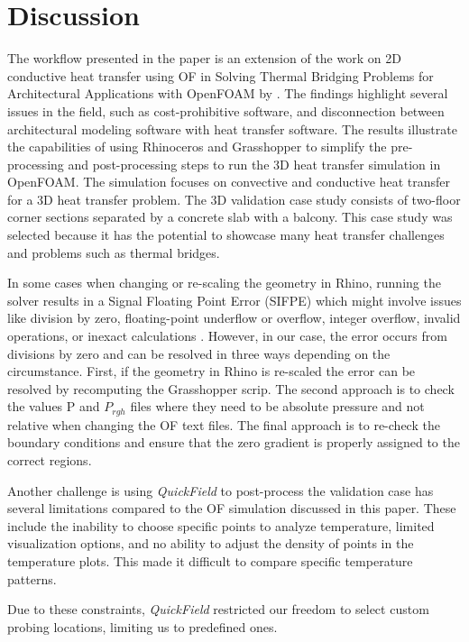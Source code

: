 \section{Discussion}


The workflow presented in the paper is an extension of the work on 2D conductive heat transfer using OF in Solving Thermal Bridging Problems for Architectural Applications with OpenFOAM by \cite{kastner2020solving}. 
The findings highlight several issues in the field, such as cost-prohibitive software, and disconnection between architectural modeling software with heat transfer software. 
The results illustrate the capabilities of using Rhinoceros and Grasshopper to simplify the pre-processing and post-processing steps to run the 3D heat transfer simulation in OpenFOAM. The simulation focuses on convective and conductive heat transfer for a 3D heat transfer problem. The 3D validation case study consists of two-floor corner sections separated by a concrete slab with a balcony. This case study was selected because it has the potential to showcase many heat transfer challenges and problems such as thermal bridges.


In some cases when changing or re-scaling the geometry in Rhino, running the solver results in a Signal Floating Point Error (SIFPE) which might involve issues like division by zero, floating-point underflow or overflow, integer overflow, invalid operations, or inexact calculations \cite{sigfpe}. However, in our case, the error occurs from divisions by zero and can be resolved in three ways depending on the circumstance. First, if the geometry in Rhino is re-scaled the error can be resolved by recomputing the Grasshopper scrip. The second approach is to check the values P and $P_{rgh}$ files where they need to be absolute pressure and not relative when changing the OF text files. The final approach is to re-check the boundary conditions and ensure that the zero gradient is properly assigned to the correct regions.


Another challenge is using \textit{QuickField} to post-process the validation case has several limitations compared to the OF simulation discussed in this paper. These include the inability to choose specific points to analyze temperature, limited visualization options, and no ability to adjust the density of points in the temperature plots. This made it difficult to compare specific temperature patterns.

Due to these constraints, \textit{QuickField} restricted our freedom to select custom probing locations, limiting us to predefined ones.




